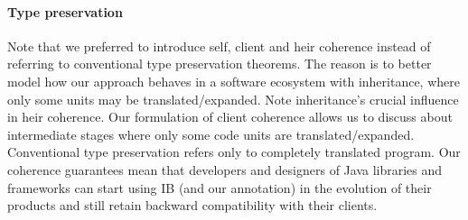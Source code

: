 \paragraph{Type preservation}
Note that we preferred to introduce self, client and heir coherence instead of referring to conventional
type preservation theorems. The reason is
to better model how our approach behaves in a \objectoriented software ecosystem with inheritance,
where only some units may be translated/expanded.
Note inheritance's crucial influence in heir coherence.
Our formulation of client coherence allows us to discuss about intermediate
stages where only some code units are translated/expanded. Conventional
type preservation refers only to completely translated program.
Our coherence guarantees mean that developers and designers of Java libraries and frameworks
can start using IB (and our \mixin annotation) in the evolution of their products
and still retain backward compatibility with their clients.


\begin{comment}
\begin{figure}[tbp]
\centering
\texttt{[image: screenshot.png]}
\caption{Screenshot.}\label{screenshot_png}
\end{figure}

\haoyuan{I tried to understand the current algorithm, and did more experiments in eclipse.
Now I borrow some ideas from the current version, and give a new version of the algorithm in text. See below.

(1) I guess the function \textsf{tops} is not necessary. The first step is still
\[\textsf{mbody}(m,C_i)\in\overline{meth}\textrm{ (excluding \textbf{static} methods)}\]

(2) Assume the context is ``interface $C_0$ extends $\overline{C}$ \{$meth'$;...\}''. First handle
\[\textsf{override}(meth',\overline{meth}) \eqno{(*)}\]

(3) If $meth'\ne\none$, $(*)$ returns $meth'$ if
\[\forall meth\in\overline{meth},meth'\subtype meth\]
even if there are conflicts in $\overline{meth}$.

(4) If $meth'=\none$, we need to figure out
\[\textsf{mostSpecific}(\overline{meth})\]
and it should be the one that ``overrides'' all the others in $\overline{meth}$. It means we should not only deal with the return types of methods, but also look into the subtyping relation of interfaces. But for abstract methods, only return types are taken into consideration.
}
\end{comment}

